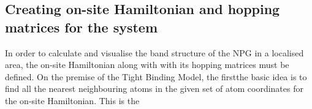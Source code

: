 \subsection{Creating on-site Hamiltonian and hopping matrices for the system}
In order to calculate and visualise the band structure of the NPG in a localised area, the on-site Hamiltonian along with with its hopping matrices must be defined. On the premise of the Tight Binding Model, the firstthe basic idea is to find all the nearest neighbouring atoms in the given set of atom coordinates for the on-site Hamiltonian. This is the  
